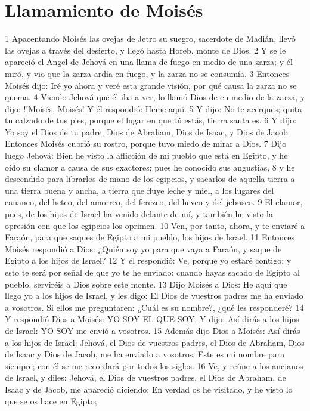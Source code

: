 \section*{Llamamiento de Moisés}
1 Apacentando Moisés las ovejas de Jetro su suegro, sacerdote de Madián, llevó las ovejas a través del desierto, y llegó hasta Horeb, monte de Dios.
2 Y se le apareció el Angel de Jehová en una llama de fuego en medio de una zarza; y él miró, y vio que la zarza ardía en fuego, y la zarza no se consumía.
3 Entonces Moisés dijo: Iré yo ahora y veré esta grande visión, por qué causa la zarza no se quema.
4 Viendo Jehová que él iba a ver, lo llamó Dios de en medio de la zarza, y dijo: !!Moisés, Moisés! Y él respondió: Heme aquí.
5 Y dijo: No te acerques; quita tu calzado de tus pies, porque el lugar en que tú estás, tierra santa es.
6 Y dijo: Yo soy el Dios de tu padre, Dios de Abraham, Dios de Isaac, y Dios de Jacob. Entonces Moisés cubrió su rostro, porque tuvo miedo de mirar a Dios.
7 Dijo luego Jehová: Bien he visto la aflicción de mi pueblo que está en Egipto, y he oído su clamor a causa de sus exactores; pues he conocido sus angustias,
8 y he descendido para librarlos de mano de los egipcios, y sacarlos de aquella tierra a una tierra buena y ancha, a tierra que fluye leche y miel, a los lugares del cananeo, del heteo, del amorreo, del ferezeo, del heveo y del jebuseo.
9 El clamor, pues, de los hijos de Israel ha venido delante de mí, y también he visto la opresión con que los egipcios los oprimen.
10 Ven, por tanto, ahora, y te enviaré a Faraón, para que saques de Egipto a mi pueblo, los hijos de Israel.
11 Entonces Moisés respondió a Dios: ¿Quién soy yo para que vaya a Faraón, y saque de Egipto a los hijos de Israel?
12 Y él respondió: Ve, porque yo estaré contigo; y esto te será por señal de que yo te he enviado: cuando hayas sacado de Egipto al pueblo, serviréis a Dios sobre este monte.
13 Dijo Moisés a Dios: He aquí que llego yo a los hijos de Israel, y les digo: El Dios de vuestros padres me ha enviado a vosotros. Si ellos me preguntaren: ¿Cuál es su nombre?, ¿qué les responderé?
14 Y respondió Dios a Moisés: YO SOY EL QUE SOY. Y dijo: Así dirás a los hijos de Israel: YO SOY me envió a vosotros.
15 Además dijo Dios a Moisés: Así dirás a los hijos de Israel: Jehová, el Dios de vuestros padres, el Dios de Abraham, Dios de Isaac y Dios de Jacob, me ha enviado a vosotros. Este es mi nombre para siempre; con él se me recordará por todos los siglos.
16 Ve, y reúne a los ancianos de Israel, y diles: Jehová, el Dios de vuestros padres, el Dios de Abraham, de Isaac y de Jacob, me apareció diciendo: En verdad os he visitado, y he visto lo que se os hace en Egipto;
